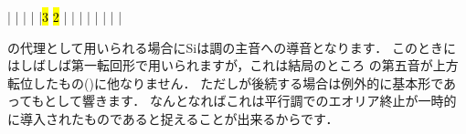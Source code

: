 \documentclass[dvipdfmx,uplatex,b5paper,openany,jbase=12Q,nomag*,textwidth-limit=44%
               ]{gachimuchi}[2020/05/05]
\begin{document}
\begin{floatMusic}[pos=ht]
  \Startpiece%
  \znotes|\en
  \NOTes
  |%
  \en\bar
  \NOTEs
  |%
  \en\doublebar
  \NOTes
  |\hl{3}%
  \hl{2}%
  \en\bar
  \NOTEs
  |%
  \en\doublebar
  \NOTes
  |%
  \en\bar
  \NOTEs
  |%
  \en\doublebar
  \NOTes
  |%
  \en\bar
  \NOTEs
  |%
  \en\setdoublebar
  \endpiece%
\end{floatMusic}


の代理として用いられる場合にSiは調の主音への導音となります．
このときにはしばしば第一転回形で用いられますが，これは結局のところ
の第五音が上方転位したもの()に他なりません．
ただしが後続する場合は例外的に基本形であってもとして響きます．
なんとなればこれは平行調でのエオリア終止が一時的に導入されたものであると捉えることが出来るからです．
\end{document}
